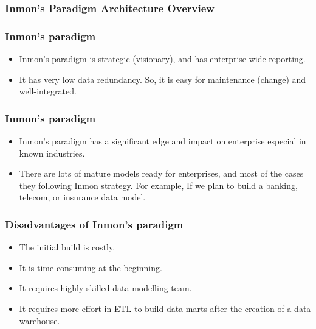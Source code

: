 \begin{frame}
	\frametitle{Inmon's Paradigm Architecture Overview}
	
\end{frame}
\begin{frame}
	\frametitle{Inmon's paradigm}
	\begin{itemize}[<+->]
		\item Inmon’s paradigm is strategic (visionary), and has enterprise-wide reporting.
		\item It has very low data redundancy. So, it is easy for maintenance (change) and well-integrated.

	\end{itemize}
	
\end{frame}
\begin{frame}
	\frametitle{Inmon's paradigm}
	\begin{itemize}[<+->]
		\item Inmon's paradigm has a significant edge and impact on enterprise especial in known industries.
		\item There are lots of mature models ready for enterprises, and most of the cases they following Inmon strategy. For example, If we plan to build a banking, telecom, or insurance data model. 
		
	\end{itemize}
	
\end{frame}
\begin{frame}
	\frametitle{Disadvantages of Inmon's paradigm}
	\begin{itemize}[<+->]
		\item The initial build is costly.
		\item It is time-consuming at the beginning. 
		\item It requires highly skilled data modelling team.
		\item It requires more effort in ETL to build data marts after the creation of a data warehouse. 
	\end{itemize}
	
\end{frame}
